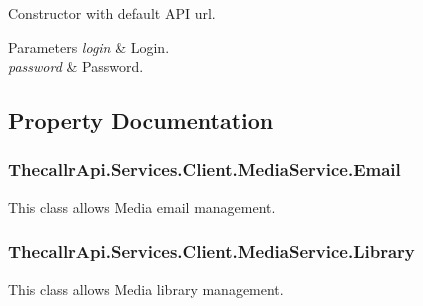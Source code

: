 Constructor with default A\+P\+I url. 


\begin{DoxyParams}{Parameters}
{\em login} & Login.\\
\hline
{\em password} & Password.\\
\hline
\end{DoxyParams}


\subsection{Property Documentation}
\hypertarget{class_thecallr_api_1_1_services_1_1_client_1_1_media_service_ae089b8524249479ae223ac30c91a7405}{
\subsubsection[{Email}]{ Thecallr\+Api.\+Services.\+Client.\+Media\+Service.\+Email\hspace{0.3cm}{\ttfamily [get]}}}\label{class_thecallr_api_1_1_services_1_1_client_1_1_media_service_ae089b8524249479ae223ac30c91a7405}


This class allows Media email management. 

\hypertarget{class_thecallr_api_1_1_services_1_1_client_1_1_media_service_a896317fa88b888876ea5bbb530d130ef}{
\subsubsection[{Library}]{ Thecallr\+Api.\+Services.\+Client.\+Media\+Service.\+Library\hspace{0.3cm}{\ttfamily [get]}}}\label{class_thecallr_api_1_1_services_1_1_client_1_1_media_service_a896317fa88b888876ea5bbb530d130ef}


This class allows Media library management. 

